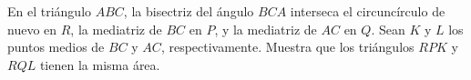 En el triángulo $ABC$, la bisectriz del ángulo $BCA$ interseca el circuncírculo de nuevo en $R$, la mediatriz de $BC$ en $P$, y la mediatriz de $AC$ en $Q$. Sean $K$ y $L$ los puntos medios de $BC$ y $AC$, respectivamente. Muestra que los triángulos $RPK$ y $RQL$ tienen la misma área.